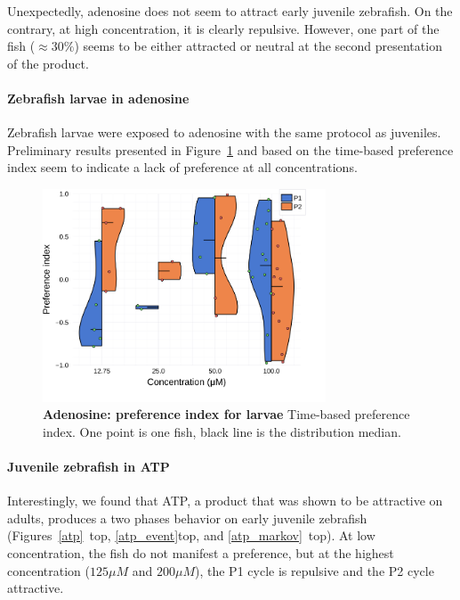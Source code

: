   Unexpectedly, adenosine does not seem to attract early juvenile zebrafish. On the contrary, at high concentration, it is clearly repulsive. However, one part of the fish ($\approx 30 \%$) seems to be either attracted or neutral at the second presentation of the product.

  \paragraph{Zebrafish larvae in adenosine} Zebrafish larvae were exposed to adenosine with the same protocol as juveniles. Preliminary results presented in Figure~\ref{dist_adenosine_lar} and based on the time-based preference index seem to indicate a lack of preference at all concentrations.

  \begin{figure}[h!]
      \centering
      \includegraphics[width=0.75\textwidth]{part_2/assets/dist_adenosine_lar.png}
      \caption{\textbf{Adenosine: preference index for larvae} Time-based preference index. One point is one fish, black line is the distribution median.}
      \label{dist_adenosine_lar}
    \end{figure}

  \paragraph{Juvenile zebrafish in ATP} Interestingly, we found that ATP, a product that was shown to be attractive on adults, produces a two phases behavior on early juvenile zebrafish (Figures~\ref{atp}~top, \ref{atp_event}top, and \ref{atp_markov}~top). At low concentration, the fish do not manifest a preference, but at the highest concentration ($125 \mu  M$  and $200 \mu M$), the P1 cycle is repulsive and the P2 cycle attractive.

